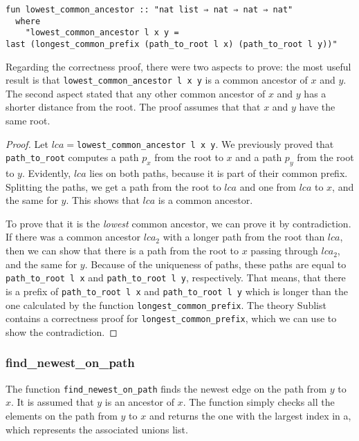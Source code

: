 \begin{lstlisting}
fun lowest_common_ancestor :: "nat list ⇒ nat ⇒ nat ⇒ nat"
  where
    "lowest_common_ancestor l x y =
last (longest_common_prefix (path_to_root l x) (path_to_root l y))"
\end{lstlisting}

Regarding the correctness proof, there were two aspects to prove: the most useful result is that \lstinline{lowest_common_ancestor l x y} is a common ancestor of $x$ and $y$. The second aspect stated that any other common ancestor of $x$ and $y$ has a shorter distance from the root. The proof assumes that that $x$ and $y$ have the same root.

\begin{proof}
Let $lca =$\lstinline{lowest_common_ancestor l x y}. We previously proved that \lstinline{path_to_root} computes a path $p_x$ from the root to $x$ and a path $p_y$ from the root to $y$. Evidently, $lca$ lies on both paths, because it is part of their common prefix. Splitting the paths, we get a path from the root to $lca$ and one from $lca$ to $x$, and the same for $y$. This shows that $lca$ is a common ancestor.

To prove that it is the \emph{lowest} common ancestor, we can prove it by contradiction. If there was a common ancestor $lca_2$ with a longer path from the root than $lca$, then we can show that there is a path from the root to $x$ passing through $lca_2$, and the same for $y$. Because of the uniqueness of paths, these paths are equal to \lstinline{path_to_root l x} and \lstinline{path_to_root l y}, respectively. That means, that there is a prefix of \lstinline{path_to_root l x} and \lstinline{path_to_root l y} which is longer than the one calculated by the function \lstinline{longest_common_prefix}. The theory Sublist\cite{Sublist} contains a correctness proof for \lstinline{longest_common_prefix}, which we can use to show the contradiction.
\end{proof}

\subsubsection{find\_newest\_on\_path}

The function \lstinline{find_newest_on_path} finds the newest edge on the path from $y$ to $x$. It is assumed that $y$ is an ancestor of $x$. The function simply checks all the elements on the path from $y$ to $x$ and returns the one with the largest index in a, which represents the associated unions list.

